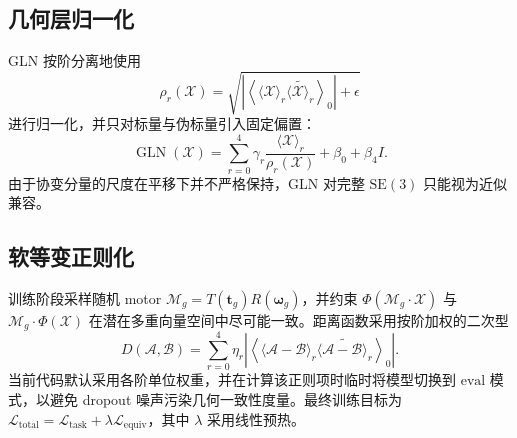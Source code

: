 \subsection{几何层归一化}\label{sec:gln}
GLN 按阶分离地使用
\begin{equation}\label{eq:gln_norm_impl}
\rho_r(\mathcal{X})=\sqrt{\left|\left\langle \langle\mathcal{X}\rangle_r\widetilde{\langle\mathcal{X}\rangle_r} \right\rangle_0\right|+\epsilon}
\end{equation}
进行归一化，并只对标量与伪标量引入固定偏置：
\begin{equation}\label{eq:gln_output_impl}
\operatorname{GLN}(\mathcal{X})=\sum_{r=0}^{4}\gamma_r\frac{\langle\mathcal{X}\rangle_r}{\rho_r(\mathcal{X})}+\beta_0+\beta_4I.
\end{equation}
由于协变分量的尺度在平移下并不严格保持，GLN 对完整 $\mathrm{SE}(3)$ 只能视为近似兼容。

\subsection{软等变正则化}\label{sec:equiv_reg}
训练阶段采样随机 motor $\mathcal{M}_g=T(\mathbf{t}_g)R(\boldsymbol{\omega}_g)$，并约束 $\Phi(\mathcal{M}_g\!\cdot\!\mathcal{X})$ 与 $\mathcal{M}_g\!\cdot\!\Phi(\mathcal{X})$ 在潜在多重向量空间中尽可能一致。距离函数采用按阶加权的二次型
\begin{equation}\label{eq:mv_distance_impl}
D(\mathcal{A},\mathcal{B}) = \sum_{r=0}^{4}\eta_r\left|\left\langle \langle\mathcal{A}-\mathcal{B}\rangle_r\widetilde{\langle\mathcal{A}-\mathcal{B}\rangle_r} \right\rangle_0\right|.
\end{equation}
当前代码默认采用各阶单位权重，并在计算该正则项时临时将模型切换到 $\mathrm{eval}$ 模式，以避免 dropout 噪声污染几何一致性度量。最终训练目标为 $\mathcal{L}_{\mathrm{total}}=\mathcal{L}_{\mathrm{task}}+\lambda\mathcal{L}_{\mathrm{equiv}}$，其中 $\lambda$ 采用线性预热。

